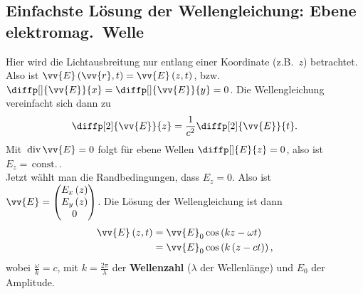 \documentclass[a4paper,12pt]{article}
\numberwithin{equation}{section}
\begin{document}
\subsection{Einfachste Lösung der Wellengleichung: Ebene elektromag.\ Welle}
Hier wird die Lichtausbreitung nur entlang einer Koordinate (z.B.\ $z$) betrachtet. Also ist $\vv{E}\left(\vv{r},t\right)=\vv{E}\left(z,t\right)$, bzw.\ $\diffp[]{\vv{E}}{x}=\diffp[]{\vv{E}}{y}=0$. Die Wellengleichung vereinfacht sich dann zu
\begin{align} 
        \diffp[2]{\vv{E}}{z}=\dfrac{1}{c^2}\diffp[2]{\vv{E}}{t}
.\end{align} 
Mit $\,\text{div}\,\vv{E}=0$ folgt für ebene Wellen $\diffp[]{E}{z}=0$, also ist $E_z=\,\text{const.}\,$.\\\indent
Jetzt wählt man die Randbedingungen, dass $E_z=0$. Also ist $\vv{E}=\begin{pmatrix}
        E_x\left(z\right)\\E_y\left(z\right)\\0
\end{pmatrix}$. Die Lösung der Wellengleichung ist dann
\begin{align} 
        \vv{E}\left(z,t\right)&=\vv{E}_0\cos \left(kz-\omega t\right)\\
                              &=\vv{E}_0\cos \left(k\left(z-ct\right)\right)
,\end{align} 
wobei $\tfrac{\omega }{k}=c$, mit $k=\tfrac{2\pi }{\lambda }$ der \textbf{Wellenzahl} ($\lambda $ der Wellenlänge) und $E_0$ der Amplitude. 




\end{document}

